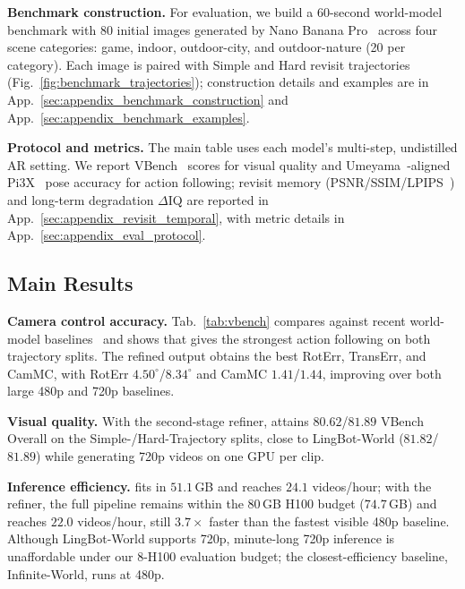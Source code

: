 \noindent
\begin{minipage}[t]{0.50\textwidth}
\vspace{0pt}
\textbf{Benchmark construction.}
For evaluation, we build a 60-second world-model benchmark with 80 initial images generated by Nano Banana Pro~\citep{google2025nanobananapro} across four scene categories: game, indoor, outdoor-city, and outdoor-nature (20 per category).
Each image is paired with Simple and Hard revisit trajectories (Fig.~\ref{fig:benchmark_trajectories}); construction details and examples are in App.~\ref{sec:appendix_benchmark_construction} and App.~\ref{sec:appendix_benchmark_examples}.

\textbf{Protocol and metrics.}
The main table uses each model's multi-step, undistilled AR setting.
We report VBench~\citep{vbench} scores for visual quality and Umeyama~\citep{umeyama}-aligned Pi3X~\citep{pi3x} pose accuracy for action following; revisit memory (PSNR/SSIM/LPIPS~\citep{lpips}) and long-term degradation $\Delta$IQ are reported in App.~\ref{sec:appendix_revisit_temporal}, with metric details in App.~\ref{sec:appendix_eval_protocol}.
\end{minipage}%
\hfill%


\vspace{-0em}


\subsection{Main Results}
\label{sec:main_results}



\noindent\textbf{Camera control accuracy.}
Tab.~\ref{tab:vbench} compares against recent world-model baselines~\citep{infinite_world,lingbot_world,hy_worldplay,matrixgame3} and shows that \modelname gives the strongest action following on both trajectory splits.
The refined output obtains the best RotErr, TransErr, and CamMC, with RotErr $4.50^\circ$/$8.34^\circ$ and CamMC $1.41$/$1.44$, improving over both large 480p and 720p baselines.

\noindent\textbf{Visual quality.}
With the second-stage refiner, \modelname attains $80.62$/$81.89$ VBench Overall on the Simple-/Hard-Trajectory splits, close to LingBot-World ($81.82$/$81.89$) while generating 720p videos on one GPU per clip.

\noindent\textbf{Inference efficiency.}
\modelname fits in $51.1$\,GB and reaches $24.1$ videos/hour; with the refiner, the full pipeline remains within the 80\,GB H100 budget ($74.7$\,GB) and reaches $22.0$ videos/hour, still $3.7\times$ faster than the fastest visible 480p baseline.
Although LingBot-World supports 720p, minute-long 720p inference is unaffordable under our 8-H100 evaluation budget; the closest-efficiency baseline, Infinite-World, runs at 480p.

